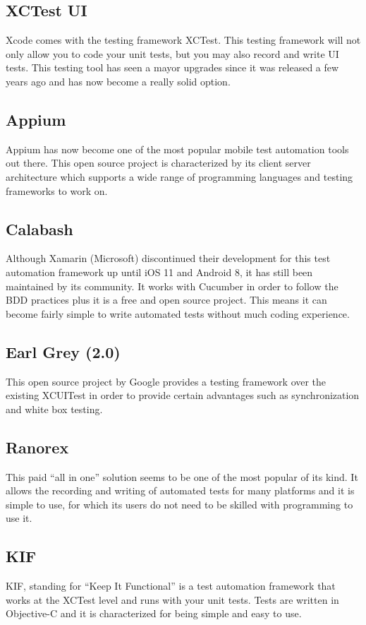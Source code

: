 \subsection {XCTest UI}
Xcode comes with the testing framework XCTest. This testing framework will not only allow you to code your unit tests, but you may also record and write UI tests. This testing tool has seen a mayor upgrades since it was released a few years ago and has now become a really solid option.

\subsection {Appium}
Appium has now become one of the most popular mobile test automation tools out there. This open source project is characterized by its client server architecture which supports a wide range of programming languages and testing frameworks to work on.

\subsection {Calabash}
Although Xamarin (Microsoft) discontinued their development for this test automation framework up until iOS 11 and Android 8, it has still been maintained by its community. It works with Cucumber in order to follow the BDD practices plus it is a free and open source project. This means it can become fairly simple to write automated tests without much coding experience.

\subsection {Earl Grey (2.0)}
This open source project by Google provides a testing framework over the existing XCUITest in order to provide certain advantages such as synchronization and white box testing.
	
\subsection {Ranorex}
This paid “all in one” solution seems to be one of the most popular of its kind. It allows the recording and writing of automated tests for many platforms and it is simple to use, for which its users do not need to be skilled with programming to use it.

\subsection {KIF}
KIF, standing for “Keep It Functional” is a test automation framework that works at the XCTest level and runs with your unit tests. Tests are written in Objective-C and it is characterized for being simple and easy to use.

